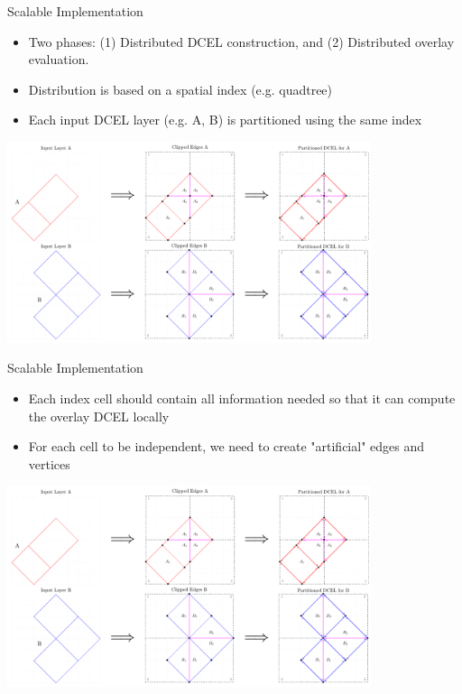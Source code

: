 \documentclass{beamer}
\begin{document}
    \begin{frame}{Scalable Implementation}
        \begin{itemize}
            \small
            \item Two phases: (1) Distributed DCEL construction, and (2) Distributed overlay evaluation.
            \item Distribution is based on a spatial index (e.g. quadtree)
            \item Each input DCEL layer (e.g. A, B) is partitioned using the same index
        \end{itemize}
        \vspace{0.25cm}

        \centering
        \includegraphics[width=0.8\textwidth]{figures/partition_strategy}
    \end{frame}

    \begin{frame}{Scalable Implementation}
        \begin{itemize}
            \small
            \item Each index cell should contain all information needed so that it can compute the overlay DCEL locally
            \item For each cell to be independent, we need to create "artificial" edges and vertices
        \end{itemize}
        \vspace{0.25cm}

        \centering
        \includegraphics[width=0.8\textwidth]{figures/partition_strategy}
    \end{frame}
\end{document}
